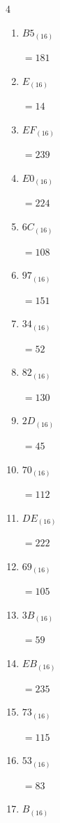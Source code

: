 \begin{multicols}{4}
\begin{enumerate}
  \item $B5_{(16)}$

        $=181$

  \item $E_{(16)}$

        $=14$

  \item $EF_{(16)}$

        $=239$

\columnbreak %

  \item $E0_{(16)}$

        $=224$

  \item $6C_{(16)}$

        $=108$

  \item $97_{(16)}$

        $=151$

  \item $34_{(16)}$

        $=52$

  \item $82_{(16)}$

        $=130$

  \item $2D_{(16)}$

        $=45$

  \item $70_{(16)}$

        $=112$

  \item $DE_{(16)}$

        $=222$

  \item $69_{(16)}$

        $=105$

  \item $3B_{(16)}$

        $=59$

  \item $EB_{(16)}$

        $=235$

  \item $73_{(16)}$

        $=115$

  \item $53_{(16)}$

        $=83$

  \item $B_{(16)}$


\end{enumerate}
\end{multicols}
